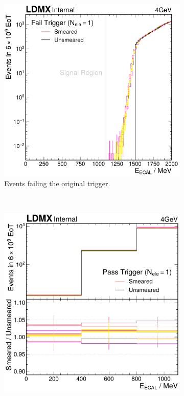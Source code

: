\begin{figure}
  \centering
  \begin{subfigure}[t]{0.48\textwidth}
    \centering
    \includegraphics[width=\textwidth]{figures/ldmx/analysis/systematics/4gev-fail-trigger-uncorrcell.pdf}
    \caption{Events failing the original trigger.}
    \label{fig:4gev-smeared-unsmeared-comp:fail-trigger}
  \end{subfigure}%
  ~
  \begin{subfigure}[t]{0.48\textwidth}
    \centering
    \includegraphics[width=\textwidth]{figures/ldmx/analysis/systematics/4gev-pass-trigger-ana-bins-uncorrcell.pdf}

\end{subfigure}
\end{figure}

